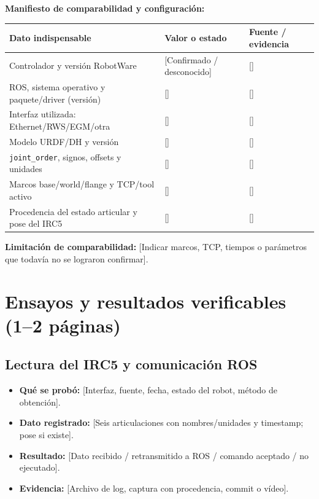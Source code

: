 \documentclass[10pt, a4paper]{article}
\newcommand{\campo}[1]{{\ttfamily\small[#1]}}
\begin{document}
\textbf{Manifiesto de comparabilidad y configuración:}

\begingroup
\footnotesize
\setlength{\tabcolsep}{4pt}
\renewcommand{\arraystretch}{1.32}
\noindent\begin{tabularx}{\textwidth}{|>{\hsize=1.05\hsize\raggedright\arraybackslash}X|>{\hsize=1.05\hsize\raggedright\arraybackslash}X|>{\hsize=0.90\hsize\raggedright\arraybackslash}X|}
\hline
\rowcolor{ucbblue!15}
\textbf{Dato indispensable} & \textbf{Valor o estado} & \textbf{Fuente / evidencia} \\ \hline
Controlador y versión RobotWare & \campo{Confirmado / desconocido} & \campo{\quad} \\ \hline
ROS, sistema operativo y paquete/driver (versión) & \campo{\quad} & \campo{\quad} \\ \hline
Interfaz utilizada: Ethernet/RWS/EGM/otra & \campo{\quad} & \campo{\quad} \\ \hline
Modelo URDF/DH y versión & \campo{\quad} & \campo{\quad} \\ \hline
\texttt{joint\_order}, signos, offsets y unidades & \campo{\quad} & \campo{\quad} \\ \hline
Marcos base/world/flange y TCP/tool activo & \campo{\quad} & \campo{\quad} \\ \hline
Procedencia del estado articular y pose del IRC5 & \campo{\quad} & \campo{\quad} \\ \hline
\end{tabularx}
\endgroup

\vspace{2pt}
\textbf{Limitación de comparabilidad:} \campo{Indicar marcos, TCP, tiempos o parámetros que todavía no se lograron confirmar}.

\section{Ensayos y resultados verificables \texorpdfstring{{\small\normalfont(1--2 páginas)}}{(1-2 páginas)}}

\subsection{Lectura del IRC5 y comunicación ROS}

\begin{itemize}
    \setlength{\itemsep}{2pt}\setlength{\parskip}{0pt}
    \item \textbf{Qué se probó:} \campo{Interfaz, fuente, fecha, estado del robot, método de obtención}.
    \item \textbf{Dato registrado:} \campo{Seis articulaciones con nombres/unidades y timestamp; pose si existe}.
    \item \textbf{Resultado:} \campo{Dato recibido / retransmitido a ROS / comando aceptado / no ejecutado}.
    \item \textbf{Evidencia:} \campo{Archivo de log, captura con procedencia, commit o vídeo}.
\end{itemize}
\end{document}
